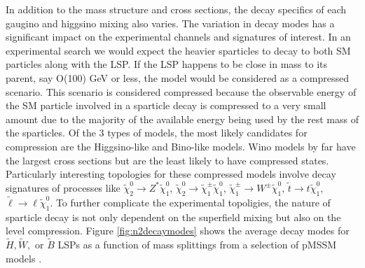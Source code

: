

In addition to the mass structure and cross sections, the decay specifics of each gaugino and higgsino mixing also varies. The variation in decay modes has a significant impact on the experimental channels and signatures of interest. In an experimental search we would expect the heavier sparticles to decay to both SM particles along with the LSP. If the LSP happens to be close in mass to its parent, say O(100) GeV or less, the model would be considered as a compressed scenario. This scenario is considered compressed because the observable energy of the SM particle involved in a sparticle decay is compressed to a very small amount due to the majority of the available energy being used by the rest mass of the sparticles. Of the 3 types of models, the most likely candidates for compression are the Higgsino-like and Bino-like models. Wino models by far have the largest cross sections but are the least likely to have compressed states. Particularly interesting topologies for these compressed models involve decay signatures of processes like $\tilde{\chi}^0_2 \rightarrow Z^*\tilde{\chi}^0_1 $, $\tilde{\chi}^0_2\rightarrow \tilde{\chi}^\pm_1 \tilde{\chi}^0_1 $, $\tilde{\chi}^\pm_1\rightarrow W^\pm \tilde{\chi}^0_1$, $\tilde{t}\rightarrow t \tilde{\chi}^0_1$, $\tilde{\ell}\rightarrow\ell \tilde{\chi}^0_1$. To further complicate the experimental topoligies, the nature of sparticle decay is not only dependent on the superfield mixing but also on the level compression. Figure \ref{fig:n2decaymodes} shows the average decay modes for $\tilde{H}, \tilde{W},$ or $\tilde{B}$ LSPs as a function of mass splittings from a selection of pMSSM models \cite{ATLAS:2015wrn}.



